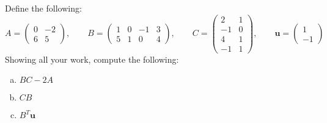 \documentclass[11pt,letterpaper]{article}
\begin{document}
 Define the following:
	\[
	A= \begin{pmatrix} 0 & -2 \\ 6 & 5 \end{pmatrix}, \qquad
	B= \begin{pmatrix} 1 & 0 & -1 & 3 \\ 5 & 1 & 0 & 4 \end{pmatrix}, \qquad
	C= \begin{pmatrix} 2 & 1 \\ -1 & 0 \\ 4 & 1 \\ -1 & 1 \end{pmatrix}, \qquad
	\mathbf{u}= \begin{pmatrix} 1 \\ -1 \end{pmatrix}
	\]
Showing all your work, compute the following:
	\begin{enumerate}[(a)]
	\item $BC - 2A$
	\item $CB$
	\item $B^T \mathbf{u}$
	\end{enumerate}



\newpage
\end{document}
